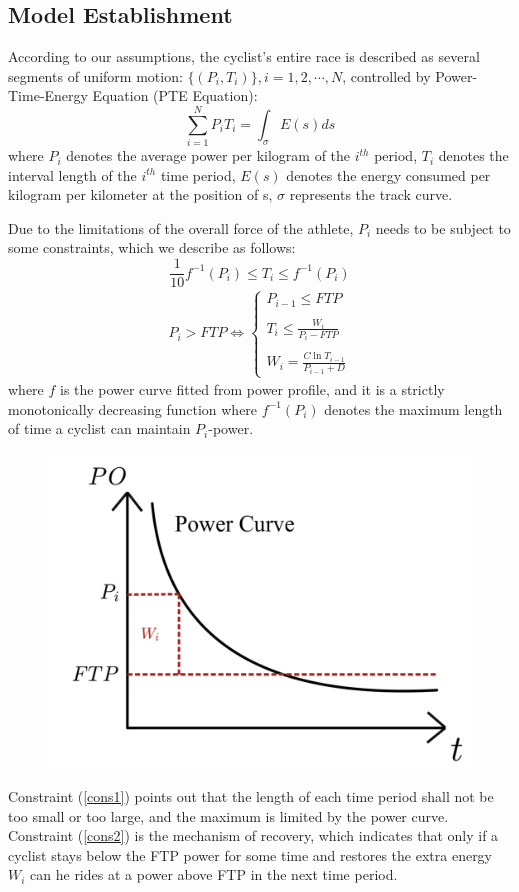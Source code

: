 \subsection{Model Establishment}
\par According to our assumptions, the cyclist's entire race is described as several segments of uniform motion: $\{(P_i,T_i)\},i=1,2,\cdots,N$, controlled by Power-Time-Energy Equation (PTE Equation):
\begin{equation}\label{PTE}
	\sum_{i=1}^N P_iT_i=\int_{\sigma }^{}E(s)ds 
\end{equation}
where $P_i$ denotes the average power per kilogram of the $i^{th}$ period, $T_i$ denotes the interval length of the $i^{th}$ time period, $E(s)$ denotes the energy consumed per kilogram per kilometer at the position of s, $\sigma$ represents the track curve.
\par Due to the limitations of the overall force of the athlete, $P_i$ needs to be subject to some constraints, which we describe as follows:
\begin{equation}\label{cons1}
\frac{1}{10} f^{-1}(P_i)\leq T_i \leq f^{-1}(P_i)
	\end{equation}
\begin{equation}\label{cons2}
	\begin{split}
		P_i > FTP \Leftrightarrow \left\{
	\begin{array}{rcl}
		P_{i-1}\leq FTP\\
		\quad \\
		T_{i} \leq \frac{W_i}{P_i-FTP}\\
		\quad\\
		W_i=\frac{C\ln T_{i-1}}{P_{i-1}+D}
	\end{array} \right.
\end{split}
\end{equation}
where $f$ is the power curve fitted from power profile, and it is a strictly monotonically decreasing function where $f^{-1}(P_i)$ denotes the maximum length of time a cyclist can maintain $P_i$-power.
\begin{figure} %
	\includegraphics[width=0.6\linewidth]{image/w}
	\label{pyramid}
\end{figure}
\par Constraint (\ref{cons1}) points out that the length of each time period shall not be too small or too large, and the maximum is limited by the power curve. Constraint (\ref{cons2}) is the mechanism of recovery, which indicates that only if a cyclist stays below the FTP power for some time and restores the extra energy $W_i$ can he rides at a power above FTP in the next time period.

